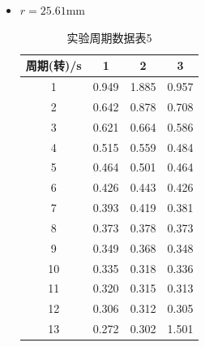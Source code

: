 \documentclass[12pt,hyperref,a4paper,UTF8]{ctexart}
\begin{document}
\begin{itemize}
            \item $r=25.61\text{mm}$
            \begin{table}[H]
                \centering
                \begin{tabular}{cccc}
                \toprule
                \textbf{周期(转)/s} & \textbf{1} & \textbf{2} & \textbf{3} \\
                \midrule
                1  & 0.949 & 1.885 & 0.957 \\
                2  & 0.642 & 0.878 & 0.708 \\
                3  & 0.621 & 0.664 & 0.586 \\
                4  & 0.515 & 0.559 & 0.484 \\
                5  & 0.464 & 0.501 & 0.464 \\
                6  & 0.426 & 0.443 & 0.426 \\
                7  & 0.393 & 0.419 & 0.381 \\
                8  & 0.373 & 0.378 & 0.373 \\
                9  & 0.349 & 0.368 & 0.348 \\
                10 & 0.335 & 0.318 & 0.336 \\
                11 & 0.320 & 0.315 & 0.313 \\
                12 & 0.306 & 0.312 & 0.305 \\
                13 & 0.272 & 0.302 & 1.501 \\
                \bottomrule
                \end{tabular}
                \caption{实验周期数据表5}
                \end{table}
                
    \end{itemize}
\end{document}
